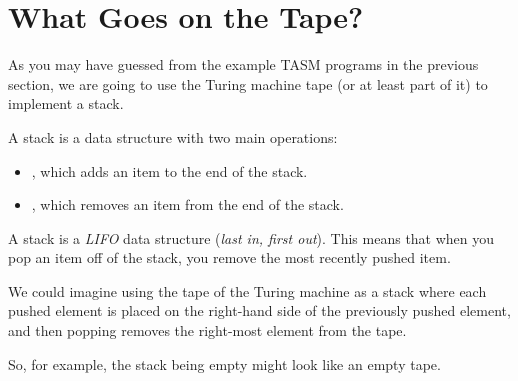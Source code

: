 \section{What Goes on the Tape?}

As you may have guessed from the example TASM programs in the previous section, we are going to use the Turing machine tape (or at least part of it) to implement a stack.

A stack is a data structure with two main operations:

\begin{itemize}
    \item {}, which adds an item to the end of the stack.
    \item {}, which removes an item from the end of the stack.
\end{itemize}

A stack is a \textit{LIFO} data structure (\textit{last in, first out}). This means that when you pop an item off of the stack, you remove the most recently pushed item.

We could imagine using the tape of the Turing machine as a stack where each pushed element is placed on the right-hand side of the previously pushed element, and then popping removes the right-most element from the tape.

So, for example, the stack being empty might look like an empty tape.

\begin{center}
\end{center}

